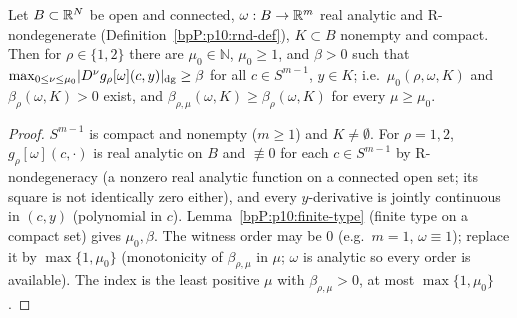 \begin{lemma}[Finite type on a compact set: $\rho=1,2$]\label{bpP:p11a:rank-compact}
Let $B\subset\mathbb{R}^N$ be open and connected, $\omega:B\to\mathbb{R}^m$ real analytic and R-nondegenerate (Definition~\ref{bpP:p10:rnd-def}), $K\subset B$ nonempty and compact. Then for $\rho\in\{1,2\}$ there are $\mu_0\in\mathbb N$, $\mu_0\ge1$, and $\beta>0$ such that $\max_{0\le\nu\le\mu_0}\lvert D^\nu g_\rho[\omega](c,y)\rvert_{\mathrm{dg}}\ge\beta$ for all $c\in S^{m-1}$, $y\in K$; i.e.\ $\mu_0(\rho,\omega,K)$ and $\beta_\rho(\omega,K)>0$ exist, and $\beta_{\rho,\mu}(\omega,K)\ge\beta_\rho(\omega,K)$ for every $\mu\ge\mu_0$.
\end{lemma}
\begin{proof}
\label{stepP:p11a:rc-reduce} $S^{m-1}$ is compact and nonempty ($m\ge1$) and $K\ne\emptyset$. For $\rho=1,2$, $g_\rho[\omega](c,\cdot)$ is real analytic on $B$ and $\not\equiv0$ for each $c\in S^{m-1}$ by R-nondegeneracy (a nonzero real analytic function on a connected open set; its square is not identically zero either), and every $y$-derivative is jointly continuous in $(c,y)$ (polynomial in $c$). Lemma~\ref{bpP:p10:finite-type} (finite type on a compact set) gives $\mu_0,\beta$. The witness order may be $0$ (e.g.\ $m=1$, $\omega\equiv1$); replace it by $\max\{1,\mu_0\}$ (monotonicity of $\beta_{\rho,\mu}$ in $\mu$; $\omega$ is analytic so every order is available). The index is the least positive $\mu$ with $\beta_{\rho,\mu}>0$, at most $\max\{1,\mu_0\}$.
\end{proof}

